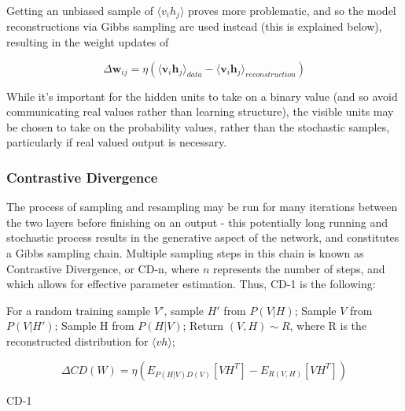 \documentclass[a4paper,11pt,oneside]{article}
\theoremstyle{plain}
\theoremstyle{definition}
\begin{document}
	
	Getting an unbiased sample of $\langle v_i h_j \rangle$ proves more problematic, and so the model reconstructions via Gibbs sampling are used instead (this is explained below), resulting in the weight updates of
	
	\begin{equation}
	\Delta \mathbf{w}_{ij} = \eta (\langle \mathbf{v}_i\mathbf{h}_j\rangle_{data} - \langle \mathbf{v}_i\mathbf{h}_j\rangle_{reconstruction})
	\end{equation}
	
	While it's important for the hidden units to take on a binary value (and so avoid communicating real values rather than learning structure), the visible units may be chosen to take on the probability values, rather than the stochastic samples, particularly if real valued output is necessary. 
	
	\subsubsection{Contrastive Divergence}\label{imp_CD}
	
	The process of sampling and resampling may be run for many iterations between the two layers before finishing on an output - this potentially long running and stochastic process results in the generative aspect of the network, and constitutes a Gibbs sampling chain. Multiple sampling steps in this chain is known as Contrastive Divergence, or CD-n, where $n$ represents the number of steps, and which allows for effective parameter estimation. Thus, CD-1 is the following:\newline
	
	
	\begin{algorithm}[H]
		
		\texttt{}\newline
		
		For a random training sample $V'$, sample $H'$ from $P(V|H)$;\newline
		Sample $V$ from $P(V|H')$;\newline
		Sample H from $P(H|V)$;\newline
		Return $(V,H) \sim R $, where R is the reconstructed distribution for $\langle vh \rangle$;\newline
		
		
		\begin{equation}
		\Delta CD(W) = \eta( E_{P(H|V)D(V)}[VH^T] - E_{R(V,H)}[VH^T])
		\end{equation}
		
		
		
		\label{algo_cd1}
		\caption{CD-1}
	\end{algorithm}
	
\end{document}
